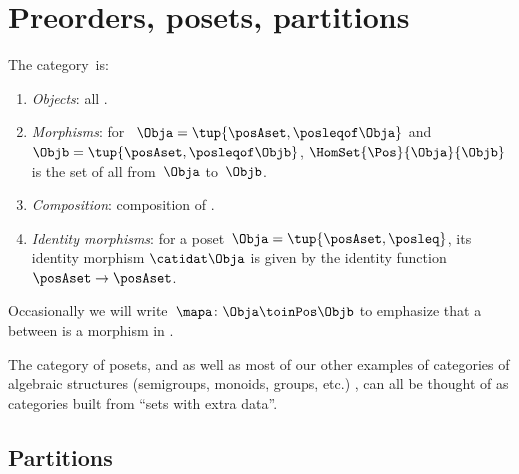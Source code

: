 
\section[Preorders, posets]{Preorders, posets, partitions}
\label{sec:category-Pos}

\begin{ctdefinition}
    \label{def:Pos}
    The category~\Pos is:
    \begin{enumerate}
        \item \emph{Objects}: all .
        \item \emph{Morphisms}: for ~$\Obja = \tup{\posAset, {{\posleqof\Obja}}}$ and $\Objb = \tup{\posAset, {{\posleqof\Objb}}}$,  $\HomSet{\Pos}{\Obja}{\Objb}$ is the set of all  from~$\Obja$ to~$\Objb$.
        \item \emph{Composition}: composition of .
        \item \emph{Identity morphisms}: for a poset~$\Obja = \tup{\posAset, {{\posleq}}}$, its identity morphism $\catidat\Obja$ is given by the identity function $\posAset \to \posAset$.
    \end{enumerate}
\end{ctdefinition}

Occasionally we will write~$\mapa \colon \Obja \toinPos \Objb$ to emphasize that a  between  is a morphism in \Pos.





\begin{remark}
    The category of posets, and as well as most of our other examples of categories of algebraic structures (semigroups, monoids, groups, etc.)
    , can all be thought of as categories built from ``sets with extra data''.
\end{remark}


\subsection{Partitions}


